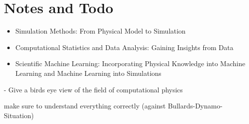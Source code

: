 \section{Notes and Todo}
\thispagestyle{plain}


\begin{itemize}
    \item Simulation Methods: From Physical Model to Simulation
    \item Computational Statistics and Data Analysis: Gaining Insights from Data
    \item Scientific Machine Learning: Incorporating Physical Knowledge into Machine Learning and Machine Learning into Simulations
\end{itemize}

- Give a birds eye view of the field of computational physics

make sure to understand everything correctly (against Bullards-Dynamo-Situation)

\pagebreak